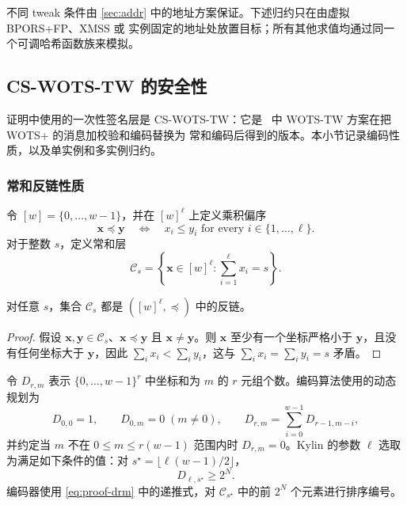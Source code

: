 不同 tweak 条件由 \cref{sec:addr} 中的地址方案保证。下述归约只在由虚拟 BPORS+FP、XMSS 或 \WOTSCS 实例固定的地址处放置目标；所有其他求值均通过同一个可调哈希函数族来模拟。

\subsection{CS-WOTS-TW 的安全性}
\label{sec:proof-cswots}

证明中使用的一次性签名层是 CS-WOTS-TW：它是~\cite{AC:HulKud22} 中 WOTS-TW 方案在把 WOTS+ 的消息加校验和编码替换为 \WOTSCS 常和编码后得到的版本。本小节记录编码性质，以及单实例和多实例归约。

\subsubsection{常和反链性质}
\label{sec:proof-antichain}

令 $[w]=\{0,\ldots,w-1\}$，并在 $[w]^\ell$ 上定义乘积偏序
\[
    \mathbf{x}\preceq\mathbf{y}
    \quad\Longleftrightarrow\quad
    x_i\le y_i\text{ for every }i\in\{1,\ldots,\ell\}.
\]
对于整数 $s$，定义常和层
\[
    \mathcal{C}_s
    =\left\{\mathbf{x}\in [w]^\ell:\sum_{i=1}^{\ell}x_i=s\right\}.
\]

\begin{lemma}[常和反链]
\label{lem:proof-antichain}
对任意 $s$，集合 $\mathcal{C}_s$ 都是 $([w]^\ell,\preceq)$ 中的反链。
\end{lemma}

\begin{proof}
假设 $\mathbf{x},\mathbf{y}\in\mathcal{C}_s$、$\mathbf{x}\preceq
\mathbf{y}$ 且 $\mathbf{x}\ne\mathbf{y}$。则 $\mathbf{x}$ 至少有一个坐标严格小于 $\mathbf{y}$，且没有任何坐标大于 $\mathbf{y}$，因此 $\sum_i x_i<\sum_i y_i$，这与 $\sum_i x_i=\sum_i y_i=s$ 矛盾。
\end{proof}

令 $D_{r,m}$ 表示 $\{0,\ldots,w-1\}^r$ 中坐标和为 $m$ 的 $r$ 元组个数。编码算法使用的动态规划为
\begin{equation}
\label{eq:proof-drm}
    D_{0,0}=1,\qquad
    D_{0,m}=0\;(m\ne0),\qquad
    D_{r,m}=\sum_{i=0}^{w-1}D_{r-1,m-i},
\end{equation}
并约定当 $m$ 不在 $0\le m\le r(w-1)$ 范围内时 $D_{r,m}=0$。Kylin 的参数 $\ell$ 选取为满足如下条件的值：对
$s^\star=\lfloor\ell(w-1)/2\rfloor$，
\begin{equation}
\label{eq:proof-len-condition}
    D_{\ell,s^\star}\ge 2^N.
\end{equation}
编码器使用 \cref{eq:proof-drm} 中的递推式，对 $\mathcal{C}_{s^\star}$ 中的前 $2^N$ 个元素进行排序编号。

